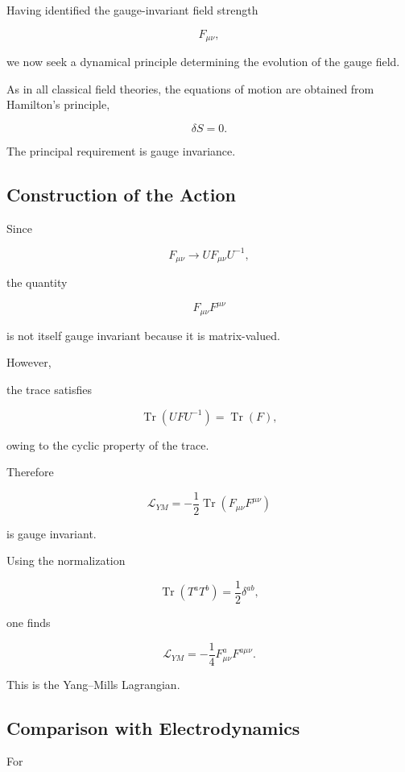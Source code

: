 Having identified the gauge-invariant field strength

\[
F_{\mu\nu},
\]

we now seek a dynamical principle determining the evolution of the gauge
field.

As in all classical field theories, the equations of motion are obtained
from Hamilton's principle,

\[
\delta S=0.
\]

The principal requirement is gauge invariance.


\subsection{Construction of the Action}

Since

\[
F_{\mu\nu}
\rightarrow
UF_{\mu\nu}U^{-1},
\]

the quantity

\[
F_{\mu\nu}F^{\mu\nu}
\]

is not itself gauge invariant because it is matrix-valued.

However,

the trace satisfies

\[
\operatorname{Tr}
(UFU^{-1})
=
\operatorname{Tr}(F),
\]

owing to the cyclic property of the trace.

Therefore

\[
\boxed{
\mathcal L_{YM}
=
-\frac12
\operatorname{Tr}
(F_{\mu\nu}F^{\mu\nu})
}
\]

is gauge invariant.

Using the normalization

\[
\operatorname{Tr}
(T^aT^b)
=
\frac12\delta^{ab},
\]

one finds

\[
\boxed{
\mathcal L_{YM}
=
-\frac14
F_{\mu\nu}^a
F^{a\mu\nu}.
}
\]

This is the Yang--Mills Lagrangian.


\subsection{Comparison with Electrodynamics}

For

